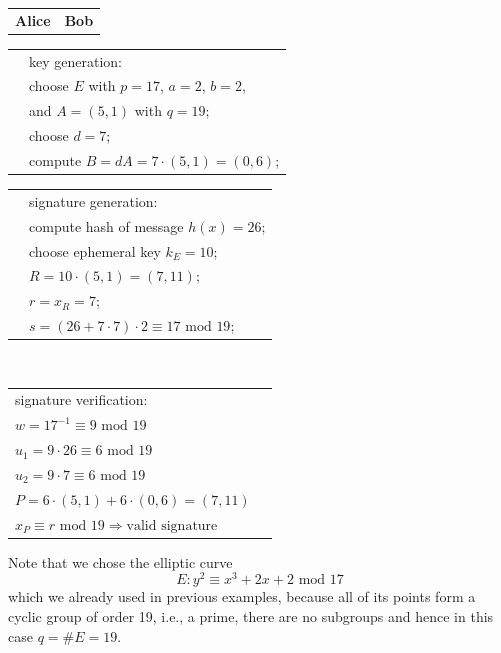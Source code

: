 \documentclass[11pt, a4paper]{article}
\newcommand{\mymod}{
    \text{ mod }
}
\begin{document}
\begin{center}
\begin{framed}
    \begin{tabular}{c@{\hskip 10cm}c}
        \textbf{Alice}&\textbf{Bob}
    \end{tabular}
    \begin{tabular}{l@{\hskip 11cm}l}
        &key generation:\\
        &choose $E$ with $p=17$, $a=2$, $b=2$,\\
        &and $A=(5,1)$ with $q=19$;\\
        &choose $d=7$;\\
        &compute $B=dA=7\cdot(5,1)=(0,6)$;
    \end{tabular}
    \begin{tabular}{l@{\hskip 11cm}l}
        &signature generation:\\
        &compute hash of message $h(x)=26$;\\
        &choose ephemeral key $k_E=10$;\\
        &$R=10\cdot(5,1)=(7,11)$;\\
        &$r=x_R=7$;\\
        &$s=(26+7\cdot7)\cdot2\equiv17\mymod19$;
    \end{tabular}
    \\
    \begin{tabular}{l@{\hskip 11cm}l}
        signature verification:&\\
        $w=17^{-1}\equiv9\mymod19$&\\
        $u_1=9\cdot26\equiv6\mymod19$&\\
        $u_2=9\cdot7\equiv6\mymod19$&\\
        $P=6\cdot(5,1)+6\cdot(0,6)=(7,11)$&\\
        $x_P\equiv r\mymod19\Longrightarrow\text{valid signature}$&
    \end{tabular}
\end{framed}
\end{center}
Note that we chose the elliptic curve
$$E:y^2\equiv x^3+2x+2\mymod17$$
which we already used in previous examples, because all of its points form a cyclic group of order 19, i.e., a prime, there are no subgroups and hence in this case $q=\#E=19$.
\end{document}
